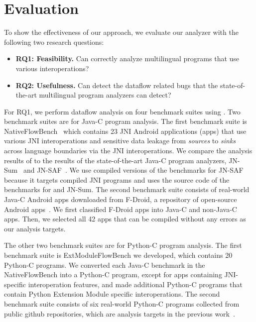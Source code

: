 \newcommand{\req}[1]{RQ#1}


\section{Evaluation}\label{sec:eval}

To show the effectiveness of our approach, we evaluate our analyzer
\ours with the following two research questions:
\begin{itemize}
  \item \textbf{\req{1}: Feasibility.} Can \ours correctly analyze multilingual
    programs that use various interoperations?

  \item \textbf{\req{2}: Usefulness.} Can \ours detect the dataflow related
    bugs that the state-of-the-art multilingual program analyzers can detect?
\end{itemize}

For \req{1}, we perform dataflow analysis on four benchmark suites using \ours.
Two benchmark suites are for Java-C program analysis. 
The first benchmark suite is NativeFlowBench~\cite{nativeflowbench, JN-SAF}
which contains 23 JNI Android applications (apps) that use various JNI
interoperations and sensitive data leakage from {\it sources} to {\it sinks}
across language boundaries via the JNI interoperations.  We compare the analysis
results of \ours to the results of the state-of-the-art Java-C program
analyzers, JN-Sum~\cite{LeeASE20} and JN-SAF~\cite{JN-SAF}. We use compiled
versions of the benchmarks for JN-SAF because it targets compiled JNI programs
and uses the source code of the benchmarks for \ours and JN-Sum.  The second
benchmark suite consists of real-world Java-C Android apps downloaded from
F-Droid, a repository of open-source Android apps~\cite{fdroid}.  We first
classified F-Droid apps into Java-C and non-Java-C apps. Then, we selected all 42
apps that can be compiled without any errors as our analysis targets.

The other two benchmark suites are for Python-C program analysis.  
The first benchmark suite is ExtModuleFlowBench we developed, which contains 20
Python-C programs.
We converted each Java-C benchmark in the NativeFlowBench into a Python-C
program, except for  apps containing JNI-specific interoperation
features, and made additional  Python-C programs that contain Python
Extension Module specific interoperations.
The second benchmark suite consists of six real-world Python-C programs
collected from public github repositories, which are analysis targets in the
previous work~\cite{cpython}.

